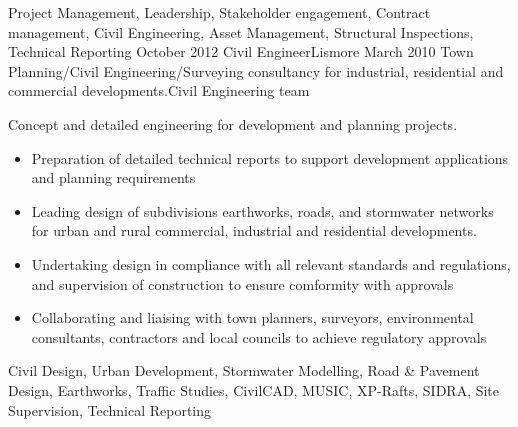 \begin{experiences}
{\begin{itemize}
                     \end{itemize}
                    }
                    {Project Management, Leadership, Stakeholder engagement, Contract management, Civil Engineering, Asset Management, Structural Inspections, Technical Reporting}
  \emptySeparator
  \consultantexperience
  {October 2012}       {Civil Engineer}{}{Lismore}
  {March 2010}      {Town Planning/Civil Engineering/Surveying consultancy for industrial, residential and commercial developments.}{Civil Engineering team}
                    {Concept and detailed engineering for development and planning projects.
           \begin{itemize}
           \item Preparation of detailed technical reports to support development applications and planning requirements
		\item Leading design of subdivisions earthworks, roads, and stormwater networks for urban and rural commercial, industrial and residential developments.
		\item Undertaking design in  compliance with all relevant standards and regulations, and supervision of construction to ensure comformity with approvals
		\item Collaborating and liaising with town planners, surveyors, environmental consultants, contractors and local councils to achieve regulatory approvals

               \end{itemize}
                    }
                    {Civil Design, Urban Development, Stormwater Modelling, Road \& Pavement Design, Earthworks, Traffic Studies, CivilCAD, MUSIC, XP-Rafts, SIDRA, Site Supervision, Technical Reporting}
  \emptySeparator
  

       
\end{experiences}
